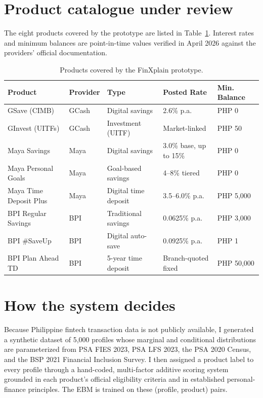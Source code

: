 \documentclass[11pt,a4paper]{article}
\begin{document}
\section*{Product catalogue under review}

The eight products covered by the prototype are listed in
Table~\ref{tab:products}. Interest rates and minimum balances are point-in-time
values verified in April 2026 against the providers' official documentation.

\begin{table}[h]
    \centering
    \small
    \caption{Products covered by the FinXplain prototype.}
    \label{tab:products}
    \begin{tabular}{lllll}
        \toprule
        \textbf{Product} & \textbf{Provider} & \textbf{Type} & \textbf{Posted Rate} & \textbf{Min. Balance} \\
        \midrule
        GSave (CIMB)             & GCash & Digital savings        & 2.6\% p.a.          & PHP 0       \\
        GInvest (UITFs)          & GCash & Investment (UITF)      & Market-linked       & PHP 50      \\
        Maya Savings             & Maya  & Digital savings        & 3.0\% base, up to 15\% & PHP 0    \\
        Maya Personal Goals      & Maya  & Goal-based savings     & 4--8\% tiered       & PHP 0       \\
        Maya Time Deposit Plus   & Maya  & Digital time deposit   & 3.5--6.0\% p.a.     & PHP 5{,}000 \\
        BPI Regular Savings      & BPI   & Traditional savings    & 0.0625\% p.a.       & PHP 3{,}000 \\
        BPI \#SaveUp             & BPI   & Digital auto-save      & 0.0925\% p.a.       & PHP 1       \\
        BPI Plan Ahead TD        & BPI   & 5-year time deposit    & Branch-quoted fixed & PHP 50{,}000\\
        \bottomrule
    \end{tabular}
\end{table}

\section*{How the system decides}

Because Philippine fintech transaction data is not publicly available, I
generated a synthetic dataset of 5{,}000 profiles whose marginal and
conditional distributions are parameterized from PSA FIES 2023, PSA LFS
2023, the PSA 2020 Census, and the BSP 2021 Financial Inclusion Survey. I
then assigned a product label to every profile through a hand-coded,
multi-factor additive scoring system grounded in each product's official
eligibility criteria and in established personal-finance principles. The
EBM is trained on these (profile, product) pairs.
\end{document}
